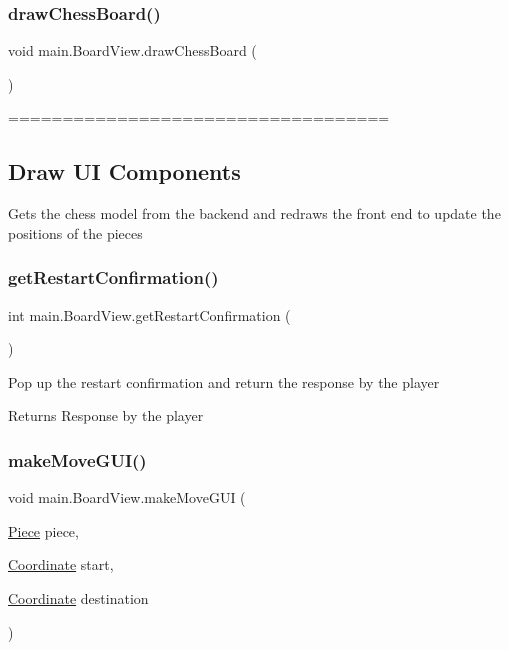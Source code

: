 \subsubsection{\texorpdfstring{draw\+Chess\+Board()}{drawChessBoard()}}
{\footnotesize\ttfamily void main.\+Board\+View.\+draw\+Chess\+Board (\begin{DoxyParamCaption}{ }\end{DoxyParamCaption})}

=================================== \subsection*{Draw UI Components }

Gets the chess model from the backend and redraws the front end to update the positions of the pieces \hypertarget{classmain_1_1_board_view_a82d7f743c08c4f25eb327af4d42d3786}{}\label{classmain_1_1_board_view_a82d7f743c08c4f25eb327af4d42d3786} 
\subsubsection{\texorpdfstring{get\+Restart\+Confirmation()}{getRestartConfirmation()}}
{\footnotesize\ttfamily int main.\+Board\+View.\+get\+Restart\+Confirmation (\begin{DoxyParamCaption}{ }\end{DoxyParamCaption})}

Pop up the restart confirmation and return the response by the player \begin{DoxyReturn}{Returns}
Response by the player 
\end{DoxyReturn}
\hypertarget{classmain_1_1_board_view_a2ad894c74ae1e240dabe0739ba2c3367}{}\label{classmain_1_1_board_view_a2ad894c74ae1e240dabe0739ba2c3367} 
\subsubsection{\texorpdfstring{make\+Move\+G\+U\+I()}{makeMoveGUI()}}
{\footnotesize\ttfamily void main.\+Board\+View.\+make\+Move\+G\+UI (\begin{DoxyParamCaption}\item[{\hyperlink{classmain_1_1pieces_1_1_piece}{Piece}}]{piece,  }\item[{\hyperlink{classmain_1_1model_1_1_coordinate}{Coordinate}}]{start,  }\item[{\hyperlink{classmain_1_1model_1_1_coordinate}{Coordinate}}]{destination }\end{DoxyParamCaption})}

